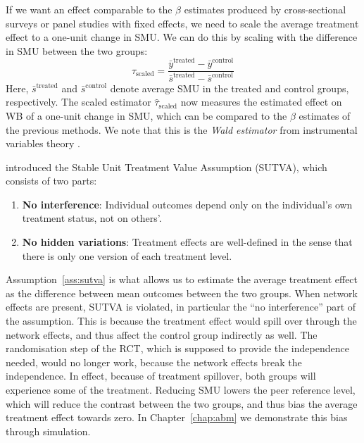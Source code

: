 If we want an effect comparable to the $\beta$ estimates produced by cross-sectional surveys or panel studies with fixed effects, we need to scale the average treatment effect to a one-unit change in SMU\@. We can do this by scaling with the difference in SMU between the two groups:
\begin{equation}
    \hat{\tau}_{\text{scaled}} = \frac{\bar{y}^{\text{treated}} - \bar{y}^{\text{control}}}{\bar{s}^{\text{treated}} - \bar{s}^{\text{control}}}
    \label{eq:rct_scaled}
\end{equation}
Here, $\bar{s}^{\text{treated}}$ and $\bar{s}^{\text{control}}$ denote average SMU in the treated and control groups, respectively. The scaled estimator $\hat{\tau}_{\text{scaled}}$ now measures the estimated effect on WB of a one-unit change in SMU, which can be compared to the $\beta$ estimates of the previous methods. We note that this is the \emph{Wald estimator} from instrumental variables theory \parencite[Sec.~4.1.2]{Angrist2009}.

\begin{assumption}[SUTVA]
    \label{ass:sutva}
    \textcite[p.~591]{Rubin1980} introduced the Stable Unit Treatment Value Assumption (SUTVA), which consists of two parts:
    \begin{enumerate}
        \item \textbf{No interference}: Individual outcomes depend only on the individual's own treatment status, not on others'.
        \item \textbf{No hidden variations}: Treatment effects are well-defined in the sense that there is only one version of each treatment level.
    \end{enumerate}
\end{assumption}


Assumption~\ref{ass:sutva} is what allows us to estimate the average treatment effect as the difference between mean outcomes between the two groups. When network effects are present, SUTVA is violated, in particular the ``no interference'' part of the assumption. This is because the treatment effect would spill over through the network effects, and thus affect the control group indirectly as well. The randomisation step of the RCT, which is supposed to provide the independence needed, would no longer work, because the network effects break the independence. In effect, because of treatment spillover, both groups will experience some of the treatment. Reducing SMU lowers the peer reference level, which will reduce the contrast between the two groups, and thus bias the average treatment effect towards zero. In Chapter~\ref{chap:abm} we demonstrate this bias through simulation.

